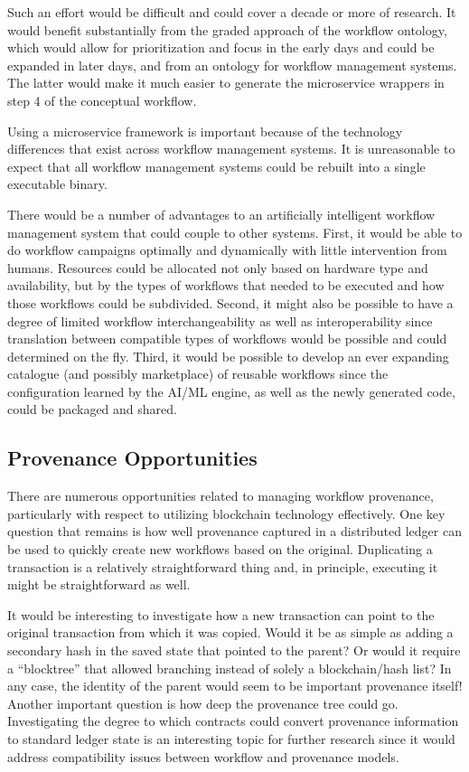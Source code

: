 Such an effort would be difficult and could cover a decade or more of research.
It would benefit substantially from the graded approach of the workflow
ontology, which would allow for prioritization and focus in the early days and
could be expanded in later days, and from an ontology for workflow management
systems. The latter would make it much easier to generate the microservice
wrappers in step 4 of the conceptual workflow.

Using a microservice framework is important because of the technology
differences that exist across workflow management systems. It is unreasonable to
expect that all workflow management systems could be rebuilt into a single
executable binary.

There would be a number of advantages to an artificially intelligent workflow
management system that could couple to other systems. First, it would be able to
do workflow campaigns optimally and dynamically with little intervention from
humans. Resources could be allocated not only based on hardware type and
availability, but by the types of workflows that needed to be executed and how
those workflows could be subdivided. Second, it might also be possible to have
a degree of limited workflow interchangeability as well as interoperability
since translation between compatible types of workflows would be possible and
could determined on the fly. Third, it would be possible to develop an ever
expanding catalogue (and possibly marketplace) of reusable workflows since the
configuration learned by the AI/ML engine, as well as the newly generated code,
could be packaged and shared.

\subsection{Provenance Opportunities}

There are numerous opportunities related to managing workflow provenance,
particularly with respect to utilizing blockchain technology effectively. One
key question that remains is how well provenance captured in a distributed
ledger can be used to quickly create new workflows based on the original.
Duplicating a transaction is a relatively straightforward thing and, in
principle, executing it might be straightforward as well.

It would be interesting to investigate how a new transaction can point to the
original transaction from which it was copied. Would it be as simple as adding a
secondary hash in the saved state that pointed to the parent? Or would it
require a “blocktree” that allowed branching instead of solely a blockchain/hash
list? In any case, the identity of the parent would seem to be important
provenance itself! Another important question is how deep the provenance tree
could go. Investigating the degree to which contracts could convert provenance
information to standard ledger state is an interesting topic for further
research since it would address compatibility issues between workflow and
provenance models.

